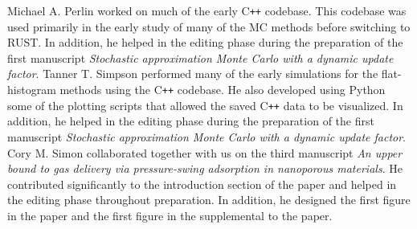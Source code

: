Michael A. Perlin worked on much of the early C{}\verb!++! codebase. This
codebase was used primarily in the early study of many of the MC methods before
switching to RUST. In addition, he helped in the editing phase during the
preparation of the first manuscript \emph{Stochastic approximation Monte Carlo
with a dynamic update factor}. Tanner T. Simpson performed many of the early
simulations for the flat-histogram methods using the C{}\verb!++! codebase. He
also developed using Python some of the plotting scripts that allowed the saved
C{}\verb!++! data to be visualized. In addition, he helped in the editing phase
during the preparation of the first manuscript \emph{Stochastic approximation
Monte Carlo with a dynamic update factor}. Cory M. Simon collaborated together
with us on the third manuscript \emph{An upper bound to gas delivery via
pressure-swing adsorption in nanoporous materials}. He contributed
significantly to the introduction section of the paper and helped in the
editing phase throughout preparation. In addition, he designed the first figure
in the paper and the first figure in the supplemental to the paper.